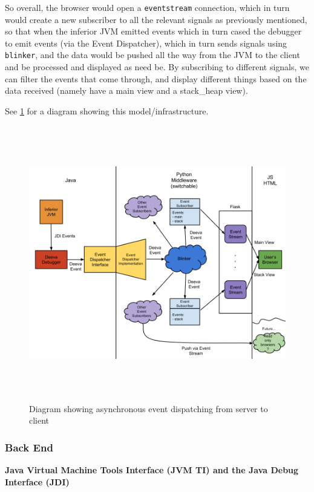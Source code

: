 \documentclass[11pt, a4paper]{article}
\begin{document}
So overall, the browser would open a \texttt{eventstream} connection, which in
turn would create a new subscriber to all the relevant signals as previously
mentioned, so that when the inferior JVM emitted events which in turn cased the
debugger to emit events (via the Event Dispatcher), which in turn sends signals
using \texttt{blinker}, and the data would be pushed all the way from the JVM to
the client and be processed and displayed as need be. By subscribing to
different signals, we can filter the events that come through, and display
different things based on the data received (namely have a main view and a
stack\_heap view).

See \ref{fig:servertoclient} for a diagram showing this model/infrastructure.
\begin{figure}[h!]
\centering
\includegraphics[width=160mm, height=120mm]{servertoclient.png}
\caption{Diagram showing asynchronous event dispatching from server to client}
\label{fig:servertoclient}
\end{figure}



\subsubsection{Back End}
\textbf{Java Virtual Machine Tools Interface (JVM TI) and the Java Debug Interface (JDI)}
\end{document}
